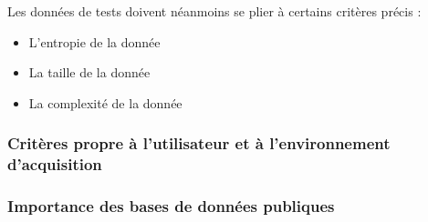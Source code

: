Les données de tests doivent néanmoins se plier à certains critères précis :\\

\begin{itemize}
	\item L'entropie de la donnée
	\item La taille de la donnée
	\item La complexité de la donnée\\
\end{itemize}

\subsubsection{Critères propre à l'utilisateur et à l'environnement d'acquisition}


\subsubsection{Importance des bases de données publiques}

